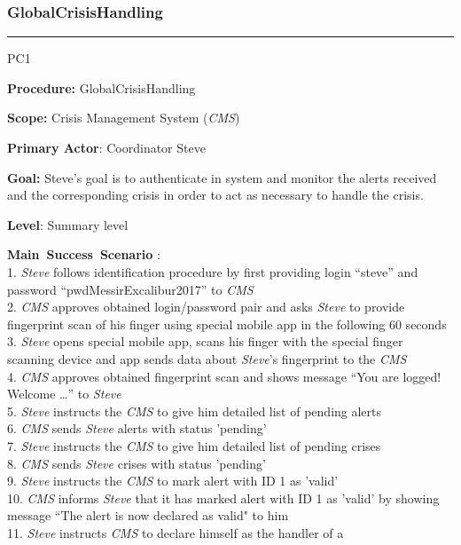 \subsubsection{GlobalCrisisHandling}

\hrule
\begin{lyxlist}{PC1}
\small{
\item [\textbf{Procedure:}] GlobalCrisisHandling 
\item [\textbf{Scope:}] Crisis Management System (\emph{CMS})
\item [\textbf{Primary Actor}:] Coordinator Steve
\item [\textbf{Goal:}] Steve’s goal is to authenticate in system and monitor
the alerts received and the corresponding crisis in order to act as necessary
to handle the crisis.
\item [\textbf{Level}:] Summary level
\item [\textbf{Main~Success~Scenario}]:\\
1. \emph{Steve} follows identification procedure by first providing login
``steve'' and password ``pwdMessirExcalibur2017'' to \emph{CMS}\\
2. \emph{CMS} approves obtained login/password pair and asks
\emph{Steve} to provide fingerprint scan of his finger using special mobile app
in the following 60 seconds\\
3. \emph{Steve} opens special mobile app, scans his finger with the special
finger scanning device and app sends data about \emph{Steve}'s fingerprint to
the \emph{CMS}\\
4. \emph{CMS} approves obtained fingerprint scan and shows message ``You are
logged! Welcome \ldots'' to \emph{Steve}\\
5. \emph{Steve} instructs the \emph{CMS} to give him detailed list of pending
alerts\\
6. \emph{CMS} sends \emph{Steve} alerts with status 'pending'\\
7. \emph{Steve} instructs the \emph{CMS} to give him detailed list of pending
crises\\
8. \emph{CMS} sends \emph{Steve} crises with status 'pending'\\
9. \emph{Steve} instructs the \emph{CMS} to mark alert with ID 1 as 'valid'\\
10. \emph{CMS} informs \emph{Steve} that it has marked alert with ID 1 as
'valid' by showing message ``The alert is now declared as valid" to him\\
11. \emph{Steve} instructs \emph{CMS} to declare himself as the handler of a
}
\end{lyxlist}
